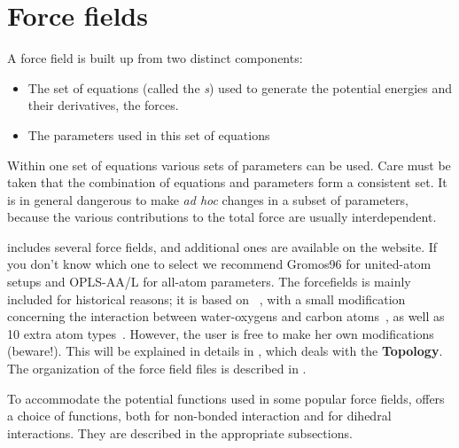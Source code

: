 % 
% 
% 
% 
% 
% 
% 
% 
%

\chapter{Force fields }
\label{ch:ff}
A force field is built up from two distinct components:
\begin{itemize}
\item The set of equations (called the {\em
{}s}) used to generate the potential
energies and their derivatives, the forces.
\item The parameters used in this set of equations
\end{itemize}
Within one set of equations various sets of parameters can be
used. Care must be taken that the combination of equations and
parameters form a consistent set. It is in general dangerous to make
{\em ad hoc} changes in a subset of parameters, because the various
contributions to the total force are usually interdependent.

{\gromacs} {\gmxver} includes several force fields, and additional ones
are available on the website. If you don't know which one to select
we recommend Gromos96 for united-atom setups and OPLS-AA/L for all-atom
parameters. The {\gromacs} forcefields is mainly included for historical
reasons; it is based on
~\cite{biomos},
with a small modification concerning the interaction between
water-oxygens and carbon atoms~\cite{Buuren93b,Mark94}, as well as 10
extra atom types~\cite{Jorgensen83,Buuren93a,Buuren93b,Mark94,Liu95}.
However, the user is free to make her own modifications (beware!).
This will be explained in details in , which deals
with the {\bf Topology}. The organization of the force field files
is described in .

To accommodate the potential functions used
in some popular force fields, {\gromacs} offers a choice of functions,
both for non-bonded interaction and for dihedral interactions. They
are described in the appropriate subsections.

